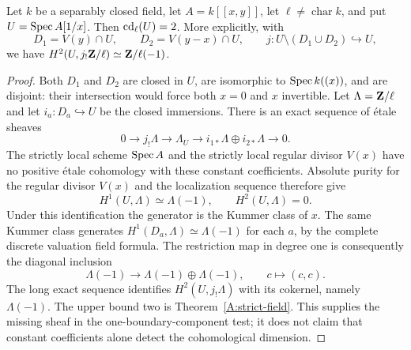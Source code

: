 \begin{proposition}
\label{A:one-divisor}
Let $k$ be a separably closed field, let $A=k[[x,y]]$, let $\ell\neq\operatorname{char}k$, and put $U=\operatorname{Spec} A[1/x]$. Then $\operatorname{cd}_\ell(U)=2$. More explicitly, with
\[
D_1=V(y)\cap U,\qquad D_2=V(y-x)\cap U,
\qquad j:U\setminus(D_1\cup D_2)\hookrightarrow U,
\]
we have $H^2(U,j_!\mathbf Z/\ell)\simeq\mathbf Z/\ell(-1)$.
\end{proposition}
\begin{proof}
Both $D_1$ and $D_2$ are closed in $U$, are isomorphic to $\operatorname{Spec} k((x))$, and are disjoint: their intersection would force both $x=0$ and $x$ invertible. Let $\Lambda=\mathbf Z/\ell$ and let $i_a:D_a\hookrightarrow U$ be the closed immersions. There is an exact sequence of étale sheaves
\[
0\longrightarrow j_!\Lambda\longrightarrow\Lambda_U
\longrightarrow i_{1*}\Lambda\oplus i_{2*}\Lambda\longrightarrow0.
\]
The strictly local scheme $\operatorname{Spec} A$ and the strictly local regular divisor $V(x)$ have no positive étale cohomology with these constant coefficients. Absolute purity for the regular divisor $V(x)$ and the localization sequence therefore give
\[
H^1(U,\Lambda)\simeq\Lambda(-1),\qquad H^2(U,\Lambda)=0.
\]
Under this identification the generator is the Kummer class of $x$. The same Kummer class generates $H^1(D_a,\Lambda)\simeq\Lambda(-1)$ for each $a$, by the complete discrete valuation field formula. The restriction map in degree one is consequently the diagonal inclusion
\[
\Lambda(-1)\longrightarrow\Lambda(-1)\oplus\Lambda(-1),
\qquad c\longmapsto(c,c).
\]
The long exact sequence identifies $H^2(U,j_!\Lambda)$ with its cokernel, namely $\Lambda(-1)$. The upper bound two is Theorem~\ref{A:strict-field}. This supplies the missing sheaf in the one-boundary-component test; it does not claim that constant coefficients alone detect the cohomological dimension.
\end{proof}

